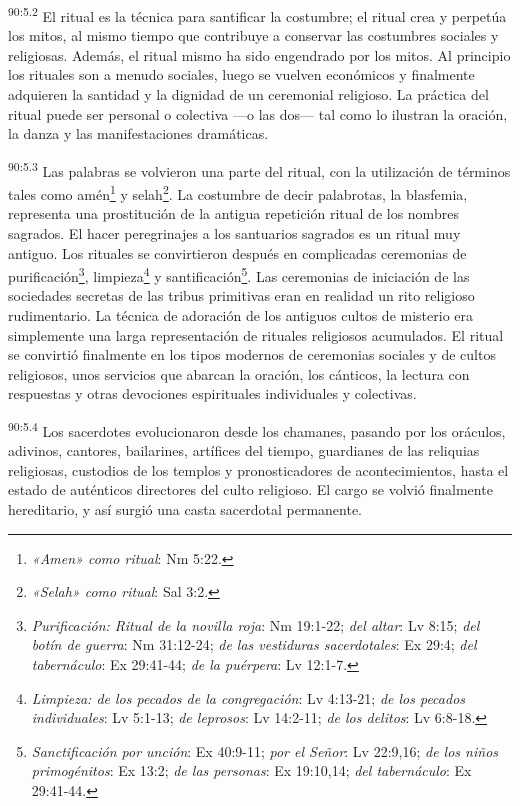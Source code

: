 \par
\textsuperscript{90:5.2} El ritual es la técnica para santificar la costumbre; el ritual crea y perpetúa los mitos, al mismo tiempo que contribuye a conservar las costumbres sociales y religiosas. Además, el ritual mismo ha sido engendrado por los mitos. Al principio los rituales son a menudo sociales, luego se vuelven económicos y finalmente adquieren la santidad y la dignidad de un ceremonial religioso. La práctica del ritual puede ser personal o colectiva ---o las dos--- tal como lo ilustran la oración, la danza y las manifestaciones dramáticas.

\par
\textsuperscript{90:5.3} Las palabras se volvieron una parte del ritual, con la utilización de términos tales como amén\footnote{\textit{«Amen» como ritual}: Nm 5:22.} y selah\footnote{\textit{«Selah»  como ritual}: Sal 3:2.}. La costumbre de decir palabrotas, la blasfemia, representa una prostitución de la antigua repetición ritual de los nombres sagrados. El hacer peregrinajes a los santuarios sagrados es un ritual muy antiguo. Los rituales se convirtieron después en complicadas ceremonias de purificación\footnote{\textit{Purificación: Ritual de la novilla roja}: Nm 19:1-22; \textit{del altar}: Lv 8:15; \textit{del botín de guerra}: Nm 31:12-24; \textit{de las vestiduras sacerdotales}: Ex 29:4; \textit{del tabernáculo}: Ex 29:41-44; \textit{de la puérpera}: Lv 12:1-7.}, limpieza\footnote{\textit{Limpieza: de los pecados de la congregación}: Lv 4:13-21; \textit{de los pecados individuales}: Lv 5:1-13; \textit{de leprosos}: Lv 14:2-11; \textit{de los delitos}: Lv 6:8-18.} y santificación\footnote{\textit{Sanctificación por unción}: Ex 40:9-11; \textit{por el Señor}: Lv 22:9,16; \textit{de los niños primogénitos}: Ex 13:2; \textit{de las personas}: Ex 19:10,14; \textit{del tabernáculo}: Ex 29:41-44.}. Las ceremonias de iniciación de las sociedades secretas de las tribus primitivas eran en realidad un rito religioso rudimentario. La técnica de adoración de los antiguos cultos de misterio era simplemente una larga representación de rituales religiosos acumulados. El ritual se convirtió finalmente en los tipos modernos de ceremonias sociales y de cultos religiosos, unos servicios que abarcan la oración, los cánticos, la lectura con respuestas y otras devociones espirituales individuales y colectivas.

\par
\textsuperscript{90:5.4} Los sacerdotes evolucionaron desde los chamanes, pasando por los oráculos, adivinos, cantores, bailarines, artífices del tiempo, guardianes de las reliquias religiosas, custodios de los templos y pronosticadores de acontecimientos, hasta el estado de auténticos directores del culto religioso. El cargo se volvió finalmente hereditario, y así surgió una casta sacerdotal permanente.

